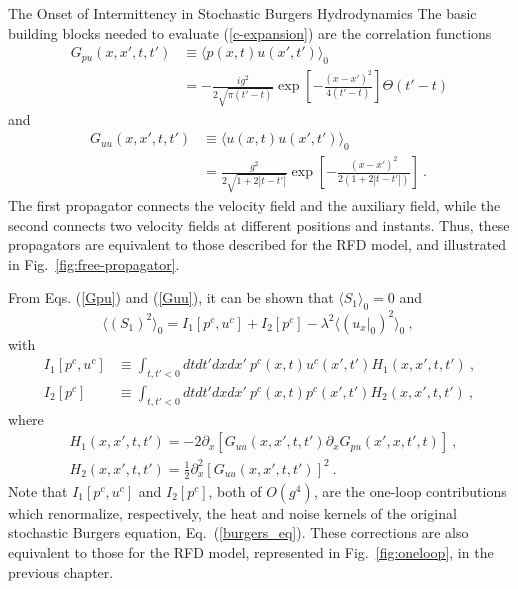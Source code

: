 \begin{chapter}{The Onset of Intermittency in Stochastic Burgers Hydrodynamics}
The basic building blocks needed to evaluate (\ref{c-expansion}) are the correlation functions
\begin{equation} \begin{split}
G_{pu}(x,x',t,t') &\equiv \langle p(x,t) u(x',t') \rangle_0 \\
&= -\frac{i g^2}{2 \sqrt{\pi (t'-t)} }
\exp \left [ - \frac{(x-x')^2}{4 (t'-t)} \right ] \Theta(t'-t) \label{Gpu}
\end{split} \end{equation}
and
\begin{equation} \begin{split}
G_{uu}(x,x',t,t') &\equiv \langle u(x,t) u(x',t') \rangle_0 \\
&= \frac{g^2}{2 \sqrt{1+2|t-t'|}} \exp \left [ - \frac{(x-x')^2}{2(1+ 2|t-t'|)} \right ]
\ . \ \label{Guu}
\end{split} \end{equation}
The first propagator connects the velocity field and the auxiliary field, while the second connects two velocity fields at different positions and instants. Thus, these propagators are equivalent to those described for the RFD model, and illustrated in Fig.~\ref{fig:free-propagator}.

From Eqs. (\ref{Gpu}) and (\ref{Guu}), it can be shown that
$\langle S_1 \rangle_0 = 0$ and
\begin{equation}
\langle (S_1)^2 \rangle_0 = I_1 [p^c,u^c] + I_2 [p^c] - \lambda^2 \langle (u_x|_0)^2 \rangle_0 \ , \ \label{S1squared}
\end{equation}
with
\begin{subequations}
\begin{align}
I_1 [p^c,u^c] &\equiv \int_{t,t'<0} dt dt'dx dx'~ p^c(x,t) u^c(x',t') H_1(x,x',t,t')   \ , \label{I1} \\
I_2 [p^c] &\equiv \int_{t,t'<0} dt dt'dx dx'~ p^c(x,t) p^c(x',t') H_2(x,x',t,t') \ , \label{I2}
\end{align}
\end{subequations}
where
\begin{equation} \begin{split}
&H_1(x,x',t,t') = -2 \partial_x [ G_{uu}(x,x',t,t') \partial_x G_{pu}(x',x,t',t) ] \ , \   \\
&H_2(x,x',t,t') = \frac{1}{2} \partial_x^2 [G_{uu}(x,x',t,t')]^2 \ . \
\end{split} \end{equation}
Note that $I_1[p^c,u^c]$ and $I_2[p^c]$, both of $O (g^4)$, are the one-loop contributions which renormalize, respectively, the heat and noise kernels of the original stochastic Burgers equation, Eq.~(\ref{burgers_eq}). These corrections are also equivalent to those for the RFD model, represented in Fig.~\ref{fig:oneloop}, in the previous chapter.


\end{chapter}
